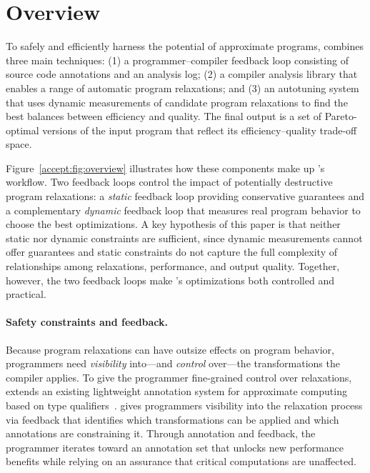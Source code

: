 \section{Overview}


To safely and efficiently harness the potential of approximate programs,
\sysname combines three main techniques: (1) a programmer--compiler
feedback loop consisting of source code annotations and an analysis log; (2) a
compiler analysis library
that enables a range of automatic program relaxations; and (3) an autotuning
system that uses dynamic measurements of candidate program relaxations to find
the best balances between efficiency and quality. The final output is a set of
Pareto-optimal versions of the input program that reflect its
efficiency--quality trade-off space.

Figure~\ref{accept:fig:overview} illustrates
how these components make up \sysname's workflow.
Two feedback loops control the impact of
potentially destructive program relaxations: a \emph{static} feedback loop
providing
conservative guarantees
and a complementary \emph{dynamic} feedback loop that measures real
program behavior to choose the best optimizations.
%
A key hypothesis of this paper is that neither static nor dynamic constraints
are sufficient, since dynamic measurements cannot offer guarantees and static
constraints do not capture the full complexity of relationships among
relaxations, performance, and output quality. Together, however, the two
feedback loops make \sysname's optimizations both controlled and practical.
%

\paragraph{Safety constraints and feedback.}
Because program relaxations can have outsize effects on program behavior,
programmers need \emph{visibility} into---and \emph{control} over---the
transformations the compiler applies.
%
To give the programmer fine-grained control over relaxations, \sysname extends
an existing lightweight annotation system for approximate computing based on
type qualifiers~\cite{enerj}.
%
\sysname gives programmers visibility into the relaxation process via feedback
that identifies which transformations can be applied and which annotations are
constraining it.  Through annotation and feedback, the programmer iterates
toward an annotation set that unlocks new performance benefits while relying on
an assurance that critical computations are unaffected.

